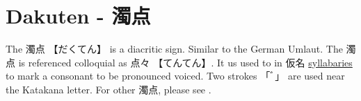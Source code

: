 \section{Dakuten - 濁点} \label{sec:Dakuten}

The {濁点} {【だくてん】} is a diacritic sign. Similar to the German Umlaut.
The {濁点} is referenced colloquial as {点々} {【てんてん】}.  It us used to in
{仮名} \hyperref[sec:Syllable]{syllabaries} to mark a consonant to be
pronounced voiced. Two strokes {「ﾞ」} are used near the Katakana letter.  For
other {濁点}, please see .

